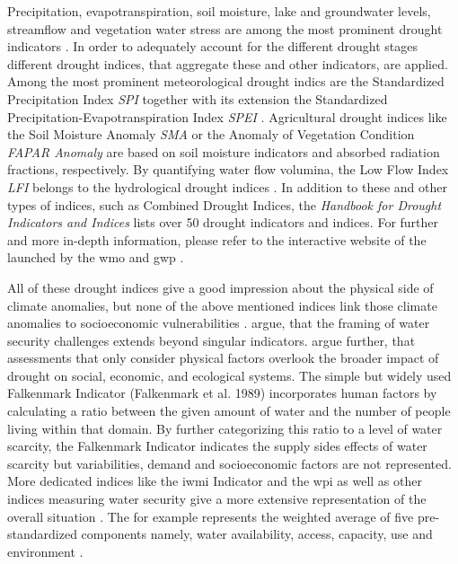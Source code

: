 Precipitation, evapotranspiration, soil moisture, lake and groundwater levels, streamflow and vegetation water stress are among the most prominent drought indicators \autocite{europeandroughtobservatoryDroughtIndicators2017}. In order to adequately account for the different drought stages different drought indices, that aggregate these and other indicators, are applied. Among the most prominent meteorological drought indics are the Standardized Precipitation Index \textit{SPI} together with its extension the Standardized Precipitation-Evapotranspiration Index \textit{SPEI} \autocite{europeandroughtobservatoryDroughtIndicators2017,ncarStandardizedPrecipitationEvapotranspiration,ncarStandardizedPrecipitationIndex}. Agricultural drought indices like the Soil Moisture Anomaly \textit{SMA} or the Anomaly of Vegetation Condition \textit{FAPAR Anomaly} are based on soil moisture indicators and absorbed radiation fractions, respectively. By quantifying water flow volumina, the Low Flow Index \textit{LFI} belongs to the hydrological drought indices \autocite{europeandroughtobservatoryDroughtIndicators2017, svobodaHandbookDroughtIndicators2016}. In addition to these and other types of indices, such as Combined Drought Indices, the \textit{Handbook for Drought Indicators and Indices} lists over 50 drought indicators and indices. For further and more in-depth information, please refer to the interactive website of the  launched by the \acrfull{wmo} and \acrfull*{gwp} \autocite{idmpIndicatorsIndicesIntegrated2021}. 

All of these drought indices give a good impression about the physical side of climate anomalies, but none of the above mentioned indices link those climate anomalies to socioeconomic vulnerabilities \autocite{enenkelWhyPredictClimate2020}. \autocite{mishraWaterSecurityChanging2021} argue, that the framing of water security challenges extends beyond singular indicators. \autocite{lackstromBackyardHydroclimatologyCitizen2022} argue further, that assessments that only consider physical factors overlook the broader impact of drought on social, economic, and ecological systems.
The simple but widely used Falkenmark Indicator (Falkenmark et al. 1989) incorporates human factors by calculating a ratio between the given amount of water and the number of people living within that domain. By further categorizing this ratio to a level of water scarcity, the Falkenmark Indicator indicates the supply sides effects of water scarcity but variabilities, demand and socioeconomic factors are not represented. More dedicated indices like the \acrfull*{iwmi} Indicator and the \acrfull*{wpi} as well as other indices measuring water security give a more extensive representation of the overall situation \autocite{arreguin-cortesMunicipalLevelWater2019,liuWaterScarcityAssessments2017}. The  for example represents the weighted average of five pre-standardized components namely, water availability, access, capacity, use and environment \autocite{sullivanWaterPovertyIndex2003}.

